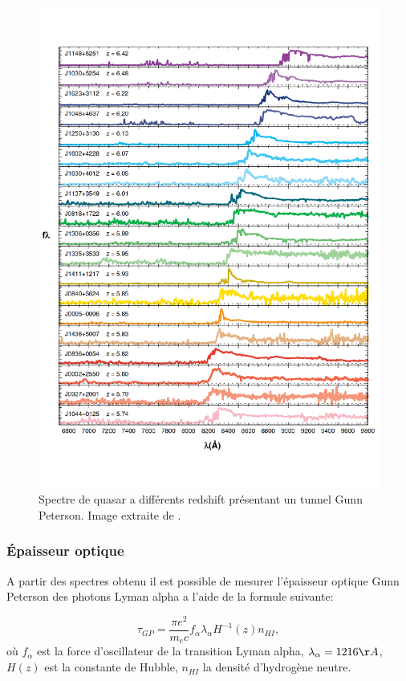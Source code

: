 \begin{figure}[bth]
        \includegraphics[width=.95\linewidth]{img/01/quasar_spectre.pdf} 
        \caption{Spectre de quasar a différents redshift présentant un tunnel Gunn Peterson.
		Image extraite de \cite{fan_constraining_2006}.}
 		\label{fig:spectre_quasar}
\end{figure}

\subsubsection{Épaisseur optique}

A partir des spectres obtenu il est possible de mesurer l’épaisseur optique Gunn Peterson \cite{1965ApJ...141.1295S} des photons Lyman alpha a l'aide de la formule suivante:

\begin{equation}
\tau_{GP} = \frac{\pi e^2}{m_e c} f_\alpha \lambda_\alpha H^{-1}(z) n_{HI},
\end{equation}
où $f_\alpha$ est la force d'oscillateur de la transition Lyman alpha, $\lambda_\alpha = 1216 \AA$, $H(z)$ est la constante de Hubble, $n_{HI}$ la densité d'hydrogène neutre.

